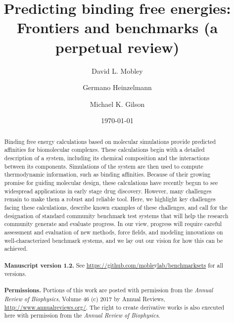 \documentclass[aps,pre,twocolumn,nofootinbib,superscriptaddress,10pt, final,tightenlines]{revtex4-1}
\begin{document}
\title{Predicting binding free energies: Frontiers and benchmarks (a perpetual review)}

\author{David L. Mobley}
\author{Germano Heinzelmann}
\author{Michael K. Gilson}


\date{\today}

\begin{abstract}
Binding free energy calculations based on molecular simulations provide predicted affinities for biomolecular complexes. 
These calculations begin with a detailed description of a system, including its chemical composition and the interactions between its components. 
Simulations of the system are then used to compute thermodynamic information, such as binding affinities. 
Because of their growing promise for guiding molecular design, these calculations have recently begun to see widespread applications in early stage drug discovery.
However, many challenges remain to make them a robust and reliable tool. 
Here, we highlight key challenges facing these calculations, describe known examples of these challenges, and call for the designation of standard community benchmark  test systems that will help the research community generate and evaluate progress.
In our view, progress will require careful assessment and evaluation of new methods, force fields, and modeling innovations on well-characterized benchmark systems, and we lay out our vision for how this can be achieved.
\\
\\
{\bf Manuscript version 1.2.} See \url{https://github.com/mobleylab/benchmarksets} for all versions.
\\
\\
{{\bf Permissions.} Portions of this work are posted with permission from the \emph{Annual Review of Biophysics}, Volume 46 (c) 2017 by Annual Reviews, \url{http://www.annualreviews.org/}. 
The right to create derivative works is also executed here with permission from the \emph{Annual Review of Biophysics}.}

\end{abstract}
\end{document}
